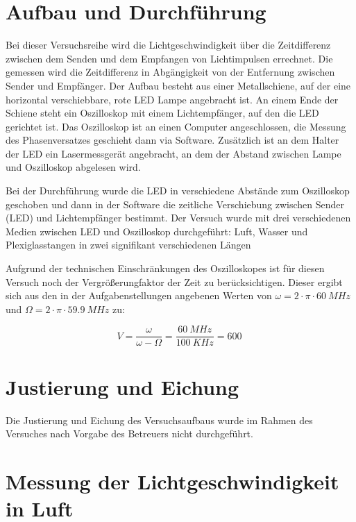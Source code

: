 \section{Aufbau und Durchführung}

Bei dieser Versuchsreihe wird die Lichtgeschwindigkeit über die Zeitdifferenz zwischen dem Senden und dem Empfangen von Lichtimpulsen errechnet.
Die gemessen wird die Zeitdifferenz in Abgängigkeit von der Entfernung zwischen Sender und Empfänger.
Der Aufbau besteht aus einer Metallschiene, auf der eine horizontal verschiebbare, rote LED Lampe angebracht ist.
An einem Ende der Schiene steht ein Oszilloskop mit einem Lichtempfänger, auf den die LED gerichtet ist.
Das Oszilloskop ist an einen Computer angeschlossen, die Messung des Phasenversatzes geschieht dann via Software.
Zusätzlich ist an dem Halter der LED ein Lasermessgerät angebracht, an dem der Abstand zwischen Lampe und Oszilloskop abgelesen wird.

Bei der Durchführung wurde die LED in verschiedene Abstände zum Oszilloskop geschoben und dann in der Software die zeitliche Verschiebung zwischen Sender (LED) und Lichtempfänger bestimmt.
Der Versuch wurde mit drei verschiedenen Medien zwischen LED und Oszilloskop durchgeführt: Luft, Wasser und Plexiglasstangen in zwei signifikant verschiedenen Längen

Aufgrund der technischen Einschränkungen des Oszilloskopes ist für diesen Versuch noch der Vergrößerungfaktor der Zeit zu berücksichtigen.
Dieser ergibt sich aus den in der Aufgabenstellungen angebenen Werten von $\omega = 2 \cdot \pi \cdot \SI{60}{MHz}$ und $\Omega = 2 \cdot \pi \cdot \SI{59,9}{MHz}$ zu:

\begin{equation}
    V = \frac{\omega}{\omega - \Omega} = \frac{\SI{60}{MHz}}{\SI{100}{KHz}} = \SI{600}{}
\end{equation}

\section{Justierung und Eichung}

Die Justierung und Eichung des Versuchsaufbaus wurde im Rahmen des Versuches nach Vorgabe des Betreuers nicht durchgeführt.

\section{Messung der Lichtgeschwindigkeit in Luft}

